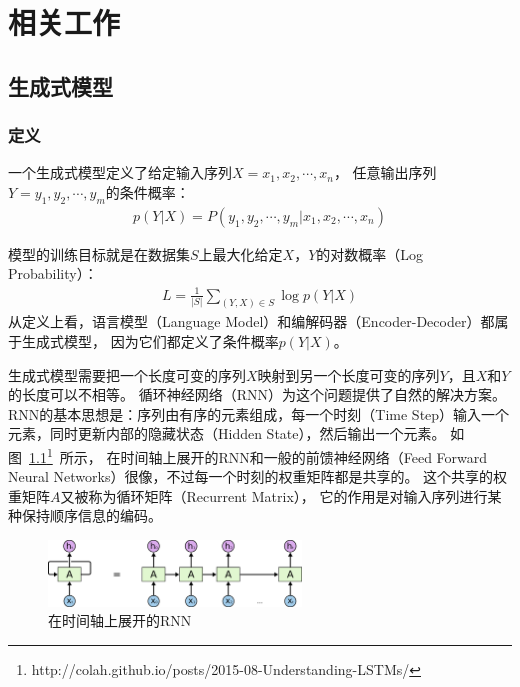 \usepackage{graphicx}


\chapter{相关工作}\label{ch:related_work}
\section{生成式模型}\label{sec:generative_model}
\subsection{定义}\label{subsec:definition}
一个生成式模型定义了给定输入序列$X = x_1, x_2, \cdots, x_n$，
任意输出序列$Y = y_1, y_2, \cdots, y_m$的条件概率：
\begin{align}
    p(Y|X) = P(y_1, y_2, \cdots, y_m|x_1, x_2, \cdots, x_n)
    \label{eqn:generative_conditional_probability}
\end{align}

模型的训练目标就是在数据集$S$上最大化给定$X$，$Y$的对数概率（Log Probability）：
\begin{align}
    \mathit{L} = \frac{1}{|S|} \sum_{(Y, X) \in S} \log p(Y|X)
\end{align}
从定义上看，语言模型（Language Model）和编解码器（Encoder-Decoder）都属于生成式模型，
因为它们都定义了条件概率$p(Y|X)$。

生成式模型需要把一个长度可变的序列$X$映射到另一个长度可变的序列$Y$，且$X$和$Y$的长度可以不相等。
循环神经网络（RNN）为这个问题提供了自然的解决方案。
RNN的基本思想是：序列由有序的元素组成，每一个时刻（Time Step）输入一个元素，同时更新内部的隐藏状态（Hidden State），然后输出一个元素。
如图~\ref{fig:RNN_unrolled}\footnote{http://colah.github.io/posts/2015-08-Understanding-LSTMs/}~所示，
在时间轴上展开的RNN和一般的前馈神经网络（Feed Forward Neural Networks）很像，不过每一个时刻的权重矩阵都是共享的。
这个共享的权重矩阵$A$又被称为循环矩阵（Recurrent Matrix），
它的作用是对输入序列进行某种保持顺序信息的编码。

\begin{figure}[H]
    \centering
    \includegraphics[width=0.6\textwidth]{figure/RNN-unrolled.png}
    \caption{在时间轴上展开的RNN}
    \label{fig:RNN_unrolled}
\end{figure}

